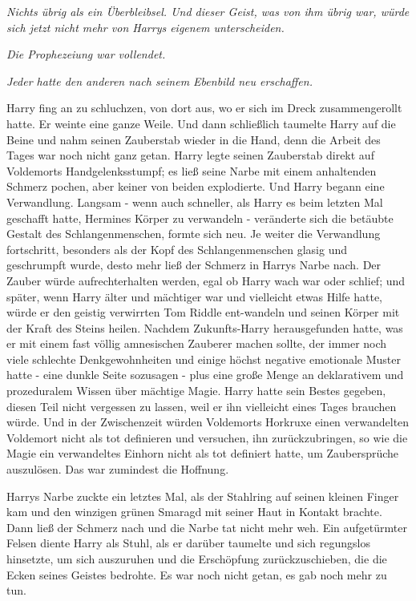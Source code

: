 {\hfill\break

\emph{Nichts übrig als ein Überbleibsel. Und dieser Geist, was von ihm übrig war, würde sich jetzt nicht mehr von Harrys eigenem unterscheiden.}

\hfill\break

\emph{Die Prophezeiung war vollendet.}

\hfill\break

\emph{Jeder hatte den anderen nach seinem Ebenbild neu erschaffen.}

Harry fing an zu schluchzen, von dort aus, wo er sich im Dreck zusammengerollt hatte. Er weinte eine ganze Weile. Und dann schließlich taumelte Harry auf die Beine und nahm seinen Zauberstab wieder in die Hand, denn die Arbeit des Tages war noch nicht ganz getan. Harry legte seinen Zauberstab direkt auf Voldemorts Handgelenksstumpf; es ließ seine Narbe mit einem anhaltenden Schmerz pochen, aber keiner von beiden explodierte. Und Harry begann eine Verwandlung. Langsam - wenn auch schneller, als Harry es beim letzten Mal geschafft hatte, Hermines Körper zu verwandeln - veränderte sich die betäubte Gestalt des Schlangenmenschen, formte sich neu. Je weiter die Verwandlung fortschritt, besonders als der Kopf des Schlangenmenschen glasig und geschrumpft wurde, desto mehr ließ der Schmerz in Harrys Narbe nach. Der Zauber würde aufrechterhalten werden, egal ob Harry wach war oder schlief; und später, wenn Harry älter und mächtiger war und vielleicht etwas Hilfe hatte, würde er den geistig verwirrten Tom Riddle ent-wandeln und seinen Körper mit der Kraft des Steins heilen. Nachdem Zukunfts-Harry herausgefunden hatte, was er mit einem fast völlig amnesischen Zauberer machen sollte, der immer noch viele schlechte Denkgewohnheiten und einige höchst negative emotionale Muster hatte - eine dunkle Seite sozusagen - plus eine große Menge an deklarativem und prozeduralem Wissen über mächtige Magie. Harry hatte sein Bestes gegeben, diesen Teil nicht vergessen zu lassen, weil er ihn vielleicht eines Tages brauchen würde. Und in der Zwischenzeit würden Voldemorts Horkruxe einen verwandelten Voldemort nicht als tot definieren und versuchen, ihn zurückzubringen, so wie die Magie ein verwandeltes Einhorn nicht als tot definiert hatte, um Zaubersprüche auszulösen. Das war zumindest die Hoffnung.

Harrys Narbe zuckte ein letztes Mal, als der Stahlring auf seinen kleinen Finger kam und den winzigen grünen Smaragd mit seiner Haut in Kontakt brachte. Dann ließ der Schmerz nach und die Narbe tat nicht mehr weh. Ein aufgetürmter Felsen diente Harry als Stuhl, als er darüber taumelte und sich regungslos hinsetzte, um sich auszuruhen und die Erschöpfung zurückzuschieben, die die Ecken seines Geistes bedrohte. Es war noch nicht getan, es gab noch mehr zu tun.

}
